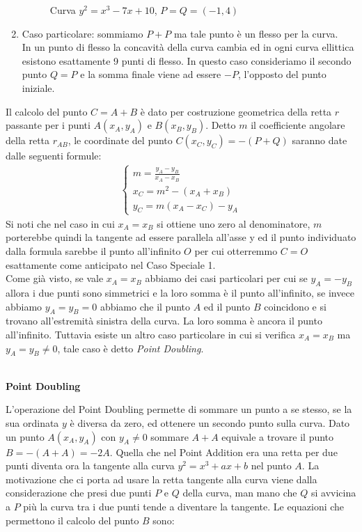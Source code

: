 \documentclass[a4paper,12pt]{tesiinfo}
\newcommand\ddfrac[2]{\frac{\displaystyle #1}{\displaystyle #2}}
\begin{document}
\begin{enumerate}
\begin{figure}[H]
    \caption{Curva $y^2 = x^3-7x+10$, $P=Q=(-1, 4)$}
  \end{figure}
  \item Caso particolare: sommiamo $P+P$ ma tale punto \`e un flesso per la curva. 
  \\
  In un punto di flesso la concavit\`a della curva cambia ed in ogni curva ellittica esistono esattamente 9 punti di flesso. In questo caso consideriamo il secondo punto $Q =P$ e la somma finale viene ad essere $-P$, l'opposto del punto iniziale.
\end{enumerate}
Il calcolo del punto $C = A + B$ \`e dato per costruzione geometrica della retta $r$ passante per i punti $A(x_A, y_A)$ e $B(x_B, y_B)$. Detto $m$ il coefficiente angolare della retta $r_{AB}$, le coordinate del punto $C(x_C, y_C) = -(P+Q)$ saranno date dalle seguenti formule:
\begin{align*}
\begin{cases}
m = \ddfrac{y_A - y_B}{x_A - x_B}\\
x_C = m^2 - (x_A + x_B)\\
y_C = m(x_A - x_C)-y_A
\end{cases}
\end{align*}
Si noti che nel caso in cui $x_A = x_B$ si ottiene uno zero al denominatore, $m$ porterebbe quindi la tangente ad essere parallela all'asse y ed il punto individuato dalla formula sarebbe il punto all'infinito $O$ per cui otterremmo $C = O$ esattamente come anticipato nel Caso Speciale 1.
\\
Come gi\`a visto, se vale $x_A = x_B$ abbiamo dei casi particolari per cui se $y_A = -y_B$ allora i due punti sono simmetrici e la loro somma \`e il punto all'infinito, se invece abbiamo $y_A = y_B = 0$ abbiamo che il punto $A$ ed il punto $B$ coincidono e si trovano all'estremit\`a sinistra della curva. La loro somma \`e ancora il punto all'infinito. Tuttavia esiste un altro caso particolare in cui si verifica $x_A = x_B$ ma $y_A = y_B \ne 0$, tale caso \`e detto \textit{Point Doubling}.
\\
\\
\begin{center}
\textbf{Point Doubling}
\end{center}
L'operazione del Point Doubling permette di sommare un punto a se stesso, se la sua ordinata $y$ \`e diversa da zero, ed ottenere un secondo punto sulla curva. Dato un punto $A(x_A, y_A)$ con $y_A \ne 0$ sommare $A+A$ equivale a trovare il punto $B = -(A+A) = -2A$. Quella che nel Point Addition era una retta per due punti diventa ora la tangente alla curva $y^2 = x^3 + ax +b$ nel punto $A$. La motivazione che ci porta ad usare la retta tangente alla curva viene dalla considerazione che presi due punti $P$ e $Q$ della curva, man mano che $Q$ si avvicina a $P$ pi\`u la curva tra i due punti tende a diventare la tangente. Le equazioni che permettono il calcolo del punto $B$ sono:
\end{document}
